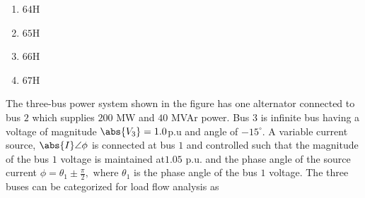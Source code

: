 \begin{enumerate}
    \item $64$H
    \item $65$H
    \item $66$H
    \item $67$H
\end{enumerate}
\bigskip
\item The three-bus power system shown in the figure has one alternator connected to
bus $2$ which supplies $200$ MW and $40$ MVAr power. Bus $3$ is infinite bus having a voltage of magnitude $\abs{V_{3}}=1.0$p.u and angle of $-15^{\circ}.$ A variable current source, $\abs{I}\angle\phi$ is connected at bus $1$ and controlled such that the magnitude of the bus $1$
voltage is maintained at$ 1.05$ p.u. and the phase angle of the source current $\phi=\theta_{1}\pm\frac{\pi}{2},\text{ where }\theta_{1}$ is the phase angle of the bus $1$ voltage. The three buses can be categorized for load flow analysis as


